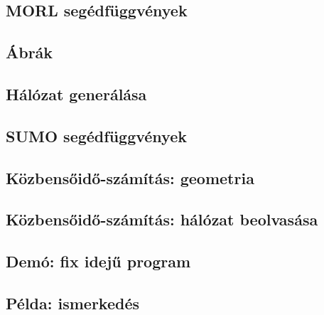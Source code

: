\subsection{MORL segédfüggvények}


\subsection{Ábrák}


\subsection{Hálózat generálása}


\subsection{SUMO segédfüggvények}


\subsection{Közbensőidő-számítás: geometria}


\subsection{Közbensőidő-számítás: hálózat beolvasása}


\subsection{Demó: fix idejű program}


\subsection{Példa: ismerkedés}


